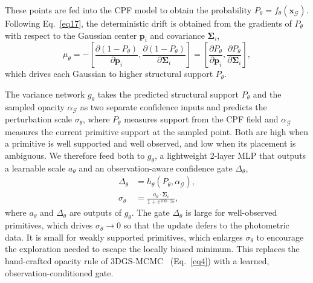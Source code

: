 \documentclass[lettersize,journal]{IEEEtran}
\begin{document}
These points are fed into the CPF model to obtain the probability $P_{\theta}=f_{\theta}(\mathbf{x}_{\mathcal{G}})$. 
{\color{blue}Following Eq.~\ref{eq17}, the deterministic drift is obtained from the gradients of $P_{\theta}$ with respect to the Gaussian center $\mathbf{p}_i$ and covariance $\mathbf{\Sigma}_i$,
\begin{equation}
    \mu_{\theta} =  - \left[ \frac{\partial \left( 1 - P_{\theta} \right)}{\partial \mathbf{p}_i}, \frac{\partial \left( 1 - P_{\theta} \right)}{\partial \mathbf{\Sigma}_i} \right] = \left[ \frac{\partial P_{\theta}}{\partial \mathbf{p}_i}, \frac{\partial P_{\theta}}{\partial \mathbf{\Sigma}_i} \right], 
    \label{eq24}
\end{equation}
which drives each Gaussian to higher structural support $P_{\theta}$.
}

The variance network $g_{\theta}$ takes the predicted structural support $P_{\theta}$ and the sampled opacity $\alpha_{\mathcal{G}}$ as two separate confidence inputs and predicts the perturbation scale $\sigma_{\theta}$, where $P_{\theta}$ measures support from the CPF field and $\alpha_{\mathcal{G}}$ measures the current primitive support at the sampled point. 
Both are high when a primitive is well supported and well observed, and low when its placement is ambiguous. 
We therefore feed both to $g_{\theta}$, a lightweight 2-layer MLP that outputs a learnable scale $a_{\theta}$ and an observation-aware confidence gate $\Delta_{\theta}$,
\begin{align}
    \Delta_{\theta} &= h_{\theta}\left(P_{\theta}, \alpha_{\mathcal{G}}\right), \\
    \sigma_{\theta} &= \frac{a_{\theta} \cdot \mathbf{\Sigma}_i}{1 + e^{100 \cdot \Delta_{\theta}}}, 
    \label{eq25}
\end{align}
where $a_{\theta}$ and $\Delta_{\theta}$ are outputs of $g_{\theta}$. 
The gate $\Delta_{\theta}$ is large for well-observed primitives, which drives $\sigma_{\theta}\!\rightarrow\!0$ so that the update defers to the photometric data. It is small for weakly supported primitives, which enlarges $\sigma_{\theta}$ to encourage the exploration needed to escape the locally biased minimum. This replaces the hand-crafted opacity rule of 3DGS-MCMC~\cite{mcmc} (Eq.~\ref{eq4}) with a learned, observation-conditioned gate.
\end{document}
